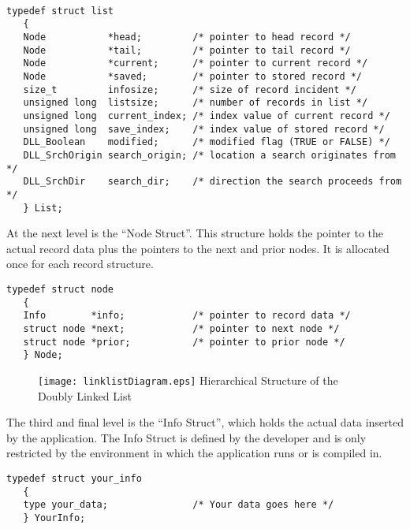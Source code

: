 \documentclass[10pt,letterpaper,titlepage]{article}
\begin{document}
\small
\begin{verbatim}

typedef struct list
   {
   Node           *head;         /* pointer to head record */
   Node           *tail;         /* pointer to tail record */
   Node           *current;      /* pointer to current record */
   Node           *saved;        /* pointer to stored record */
   size_t         infosize;      /* size of record incident */
   unsigned long  listsize;      /* number of records in list */
   unsigned long  current_index; /* index value of current record */
   unsigned long  save_index;    /* index value of stored record */
   DLL_Boolean    modified;      /* modified flag (TRUE or FALSE) */
   DLL_SrchOrigin search_origin; /* location a search originates from */
   DLL_SrchDir    search_dir;    /* direction the search proceeds from */
   } List;
\end{verbatim}
\normalsize
\vspace{8pt}

\noindent
At the next level is the ``Node Struct''.  This structure holds the pointer to the actual record data plus the pointers to the next and prior nodes.  It is allocated once for each record structure.

\small
\begin{verbatim}
typedef struct node
   {
   Info        *info;            /* pointer to record data */
   struct node *next;            /* pointer to next node */
   struct node *prior;           /* pointer to prior node */
   } Node;
\end{verbatim}
\normalsize
\vspace{8pt}

\begin{figure}
\begin{center}
\graphicspath{{.}}
\texttt{[image: linklistDiagram.eps]}
\vspace{8pt}
Hierarchical Structure of the Doubly Linked List
\end{center}
\end{figure}

\pagebreak
\noindent
The third and final level is the ``Info Struct'', which holds the actual data inserted by the application.  The Info Struct is defined by the developer and is only restricted by the environment in which the application runs or is compiled in.

\small
\begin{verbatim}
typedef struct your_info
   {
   type your_data;               /* Your data goes here */
   } YourInfo;
\end{verbatim}
\normalsize
\vspace{8pt}
\end{document}
